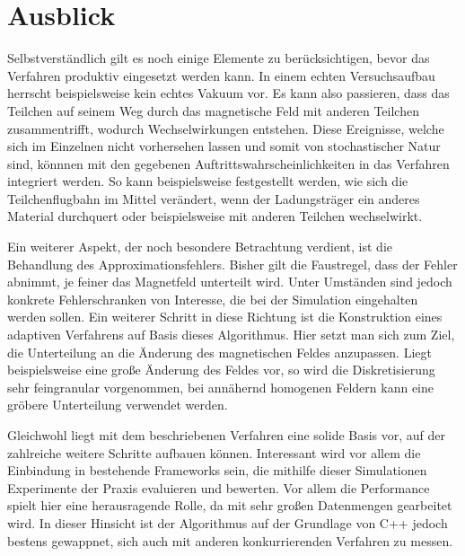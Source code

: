 \chapter{Ausblick}

Selbstverst\"andlich gilt es noch einige Elemente zu ber\"ucksichtigen, bevor das Verfahren produktiv eingesetzt werden kann.
In einem echten Versuchsaufbau herrscht beispielsweise kein echtes Vakuum vor. Es kann also passieren, dass das Teilchen auf seinem
Weg durch das magnetische Feld mit anderen Teilchen zusammentrifft, wodurch Wechselwirkungen entstehen. Diese Ereignisse, welche
sich im Einzelnen nicht vorhersehen lassen und somit von stochastischer Natur sind, k\"onnnen mit den gegebenen Auftrittswahrscheinlichkeiten in das Verfahren integriert werden. So kann beispielsweise festgestellt werden, wie sich die Teilchenflugbahn im Mittel ver\"andert,
wenn der Ladungstr\"ager ein anderes Material durchquert oder beispielsweise mit anderen Teilchen wechselwirkt.

Ein weiterer Aspekt, der noch besondere Betrachtung verdient, ist die Behandlung des Approximationsfehlers. Bisher gilt die Faustregel, dass
der Fehler abnimmt, je feiner das Magnetfeld unterteilt wird. Unter Umst\"anden sind jedoch konkrete Fehlerschranken von Interesse, die bei der
Simulation eingehalten werden sollen. Ein weiterer Schritt in diese Richtung ist die Konstruktion eines adaptiven Verfahrens auf Basis dieses Algorithmus.
Hier setzt man sich zum Ziel, die Unterteilung an die \"Anderung des magnetischen Feldes anzupassen. Liegt beispielsweise eine gro{\ss}e \"Anderung des Feldes
vor, so wird die Diskretisierung sehr feingranular vorgenommen, bei ann\"ahernd homogenen Feldern kann eine gr\"obere Unterteilung verwendet werden.

Gleichwohl liegt mit dem beschriebenen Verfahren eine solide Basis vor, auf der zahlreiche weitere Schritte aufbauen k\"onnen. Interessant
wird vor allem die Einbindung in bestehende Frameworks sein, die mithilfe dieser Simulationen Experimente der Praxis evaluieren und bewerten.
Vor allem die Performance spielt hier eine herausragende Rolle, da mit sehr gro{\ss}en Datenmengen gearbeitet wird. In dieser Hinsicht ist der
Algorithmus auf der Grundlage von C++ jedoch bestens gewappnet, sich auch  mit anderen konkurrierenden Verfahren zu messen.
